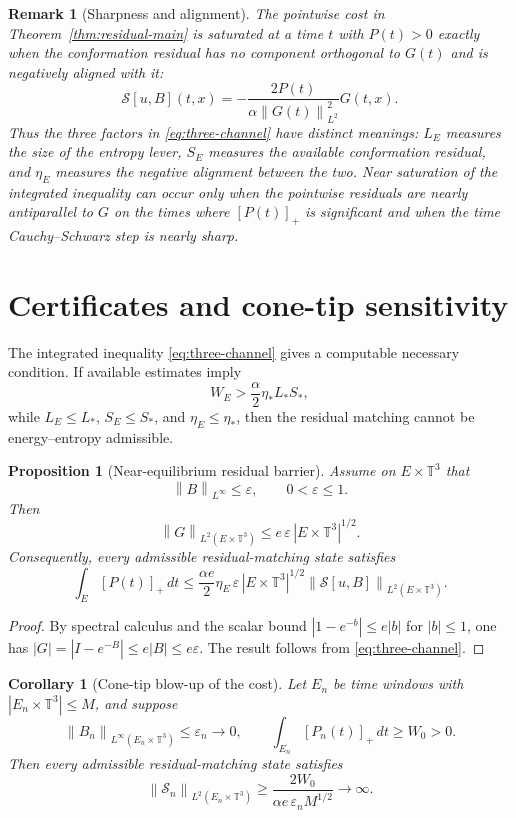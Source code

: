 \documentclass[10pt,a4paper]{amsart}
\numberwithin{equation}{section}
\newtheorem{proposition}[theorem]{Proposition}
\newtheorem{corollary}[theorem]{Corollary}
\newtheorem{remark}[theorem]{Remark}
\newcommand{\T}{\mathbb T}
\newcommand{\Id}{I}
\newcommand{\calS}{\mathcal S}
\newcommand{\norm}[1]{\left\lVert #1\right\rVert}
\begin{document}
\begin{remark}[Sharpness and alignment]
The pointwise cost in Theorem~\ref{thm:residual-main} is saturated at a time
\(t\) with \(P(t)>0\) exactly when the conformation residual has no component
orthogonal to \(G(t)\) and is negatively aligned with it:
\[
  \calS[u,B](t,x)
  =
  -\frac{2P(t)}{\alpha\norm{G(t)}_{L^2}^2}G(t,x).
\]
Thus the three factors in \eqref{eq:three-channel} have distinct meanings:
\(L_E\) measures the size of the entropy lever, \(S_E\) measures the available
conformation residual, and \(\eta_E\) measures the negative alignment between
the two.  Near saturation of the integrated inequality can occur only when
the pointwise residuals are nearly antiparallel to \(G\) on the times where
\([P(t)]_+\) is significant and when the time Cauchy--Schwarz step is nearly
sharp.
\end{remark}

\section{Certificates and cone-tip sensitivity}

The integrated inequality \eqref{eq:three-channel} gives a computable
necessary condition.  If available estimates imply
\[
  W_E>\frac{\alpha}{2}\eta_*L_*S_*,
\]
while \(L_E\le L_*\), \(S_E\le S_*\), and \(\eta_E\le\eta_*\), then the
residual matching cannot be energy--entropy admissible.

\begin{proposition}[Near-equilibrium residual barrier]
\label{prop:near-equilibrium}
Assume on \(E\times\T^3\) that
\[
  \norm{B}_{L^\infty}\le\varepsilon,\qquad 0<\varepsilon\le1.
\]
Then
\[
  \norm{G}_{L^2(E\times\T^3)}
  \le e\,\varepsilon\,|E\times\T^3|^{1/2}.
\]
Consequently, every admissible residual-matching state satisfies
\[
  \int_E[P(t)]_+\,dt
  \le
  \frac{\alpha e}{2}
  \eta_E\,\varepsilon\,|E\times\T^3|^{1/2}
  \norm{\calS[u,B]}_{L^2(E\times\T^3)}.
\]
\end{proposition}

\begin{proof}
By spectral calculus and the scalar bound
\(|1-e^{-b}|\le e|b|\) for \(|b|\le1\), one has
\(|G|=|\Id-e^{-B}|\le e|B|\le e\varepsilon\).  The result follows from
\eqref{eq:three-channel}.
\end{proof}

\begin{corollary}[Cone-tip blow-up of the cost]
Let \(E_n\) be time windows with \(|E_n\times\T^3|\le M\), and suppose
\[
  \norm{B_n}_{L^\infty(E_n\times\T^3)}\le\varepsilon_n\to0,\qquad
  \int_{E_n}[P_n(t)]_+\,dt\ge W_0>0 .
\]
Then every admissible residual-matching state satisfies
\[
  \norm{\calS_n}_{L^2(E_n\times\T^3)}
  \ge
  \frac{2W_0}{\alpha e\,\varepsilon_nM^{1/2}}
  \to\infty .
\]
\end{corollary}
\end{document}
